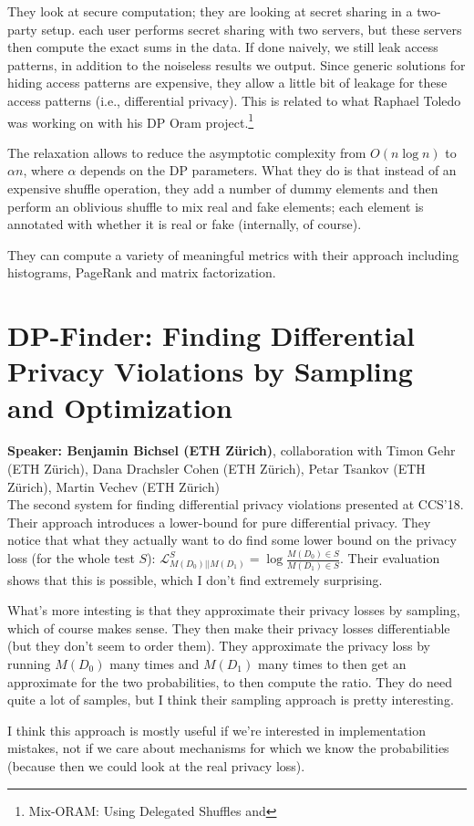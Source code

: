 \documentclass{article}
\begin{document}
They look at secure computation; they are looking at secret sharing in a two-party setup. each user performs secret sharing with two servers, but these servers then compute the exact sums in the data. If done naively, we still leak access patterns, in addition to the noiseless results we output. Since generic solutions for hiding access patterns are expensive, they allow a little bit of leakage for these access patterns (i.e., differential privacy). This is related to what Raphael Toledo was working on with his DP Oram project.\footnote{Mix-ORAM: Using Delegated Shuffles and }

The relaxation allows to reduce the asymptotic complexity from $O(n\log n)$ to $\alpha n$, where $\alpha$ depends on the DP parameters.  What they do is that instead of an expensive shuffle operation, they add a number of dummy elements and then perform an oblivious shuffle to mix real and fake elements; each element is annotated with whether it is real or fake (internally, of course).

They can compute a variety of meaningful metrics with their approach including histograms, PageRank and matrix factorization.

\section{DP-Finder: Finding Differential Privacy Violations by Sampling and Optimization}
\noindent\textbf{Speaker: Benjamin Bichsel (ETH Zürich)}, collaboration with Timon Gehr (ETH Zürich), Dana Drachsler Cohen (ETH Zürich), Petar Tsankov (ETH Zürich), Martin Vechev (ETH Zürich)\\

The second system for finding differential privacy violations presented at CCS'18. Their approach introduces a lower-bound for pure differential privacy. They notice that what they actually want to do find some lower bound on the privacy loss (for the whole test $S$): $\mathcal L^S_{M(D_0)||M(D_1)} = \log\frac{M(D_0) \in S}{M(D_1) \in S}$. Their evaluation shows that this is possible, which I don't find extremely surprising.

What's more intesting is that they approximate their privacy losses by sampling, which of course makes sense. They then make their privacy losses differentiable (but they don't seem to order them). They approximate the privacy loss by running $M(D_0)$ many times and $M(D_1)$ many times to then get an approximate for the two probabilities, to then compute the ratio. They do need quite a lot of samples, but I think their sampling approach is pretty interesting.

I think this approach is mostly useful if we're interested in implementation mistakes, not if we care about mechanisms for which we know the probabilities (because then we could look at the real privacy loss).





\end{document}
